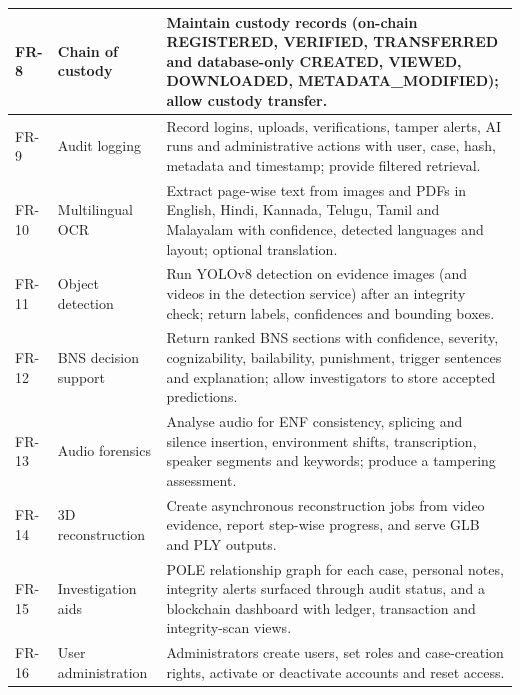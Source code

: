 \documentclass[12pt,a4paper,oneside]{report}
\begin{document}
{\begin{longtable}{|>{\raggedright\arraybackslash}p{1.33cm}|>{\raggedright\arraybackslash}p{3.03cm}|>{\raggedright\arraybackslash}p{9.85cm}|}
FR-8 & Chain of custody & Maintain custody records (on-chain REGISTERED, VERIFIED, TRANSFERRED and database-only CREATED, VIEWED, DOWNLOADED, METADATA\_MODIFIED); allow custody transfer. \\ \hline
FR-9 & Audit logging & Record logins, uploads, verifications, tamper alerts, AI runs and administrative actions with user, case, hash, metadata and timestamp; provide filtered retrieval. \\ \hline
FR-10 & Multilingual OCR & Extract page-wise text from images and PDFs in English, Hindi, Kannada, Telugu, Tamil and Malayalam with confidence, detected languages and layout; optional translation. \\ \hline
FR-11 & Object detection & Run YOLOv8 detection on evidence images (and videos in the detection service) after an integrity check; return labels, confidences and bounding boxes. \\ \hline
FR-12 & BNS decision support & Return ranked BNS sections with confidence, severity, cognizability, bailability, punishment, trigger sentences and explanation; allow investigators to store accepted predictions. \\ \hline
FR-13 & Audio forensics & Analyse audio for ENF consistency, splicing and silence insertion, environment shifts, transcription, speaker segments and keywords; produce a tampering assessment. \\ \hline
FR-14 & 3D reconstruction & Create asynchronous reconstruction jobs from video evidence, report step-wise progress, and serve GLB and PLY outputs. \\ \hline
FR-15 & Investigation aids & POLE relationship graph for each case, personal notes, integrity alerts surfaced through audit status, and a blockchain dashboard with ledger, transaction and integrity-scan views. \\ \hline
FR-16 & User administration & Administrators create users, set roles and case-creation rights, activate or deactivate accounts and reset access. \\ \hline
\end{longtable}
}
\end{document}
